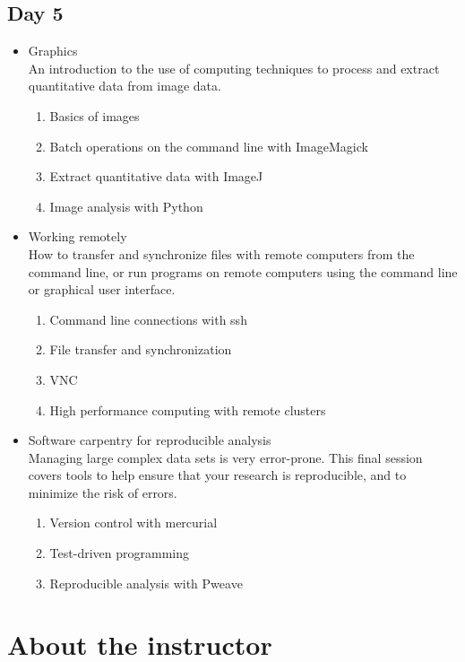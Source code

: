 \documentclass[11pt,letter]{article}
\begin{document}
\subsection{Day 5}
\label{sec-1-5}
\begin{itemize}

\item Graphics\\
\label{sec-1-5-1}%
An introduction to the use of computing techniques to process and extract quantitative data from image data. 
\begin{enumerate}
\item Basics of images
\item Batch operations on the command line with ImageMagick
\item Extract quantitative data with ImageJ
\item Image analysis with Python
\end{enumerate}

\item Working remotely\\
\label{sec-1-5-2}%
How to transfer and synchronize files with remote computers from the command line, or run programs on remote computers using the command line or graphical user interface.
\begin{enumerate}
\item Command line connections with ssh
\item File transfer and synchronization
\item VNC
\item High performance computing with remote clusters
\end{enumerate}

\item Software carpentry for reproducible analysis\\
\label{sec-1-5-3}%
Managing large complex data sets is very error-prone. This final session covers tools to help ensure that your research is reproducible, and to minimize the risk of errors.
\begin{enumerate}
\item Version control with mercurial
\item Test-driven programming
\item Reproducible analysis with Pweave
\end{enumerate}


\end{itemize} %
\section{About the instructor}
\label{sec-2}
\end{document}
